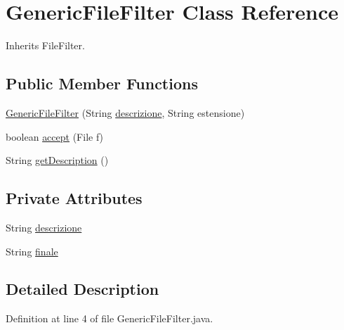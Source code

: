 \hypertarget{class_generic_file_filter}{\section{Generic\-File\-Filter Class Reference}
\label{class_generic_file_filter}
}


Inherits File\-Filter.

\subsection*{Public Member Functions}
\begin{DoxyCompactItemize}
\item 
\hyperlink{class_generic_file_filter_a96d78c6c212bfbf0be95a4d10937a89d}{Generic\-File\-Filter} (String \hyperlink{class_generic_file_filter_a9953e3b3aa3dee91452cb9c2ad80822b}{descrizione}, String estensione)
\item 
boolean \hyperlink{class_generic_file_filter_a03eee4e0d87525559746265dc63c9319}{accept} (File f)
\item 
String \hyperlink{class_generic_file_filter_a6918acbc60f5dcff51cb92a9487e2493}{get\-Description} ()
\end{DoxyCompactItemize}
\subsection*{Private Attributes}
\begin{DoxyCompactItemize}
\item 
String \hyperlink{class_generic_file_filter_a9953e3b3aa3dee91452cb9c2ad80822b}{descrizione}
\item 
String \hyperlink{class_generic_file_filter_a9468f04e6ea80d41e6bc69b59769b751}{finale}
\end{DoxyCompactItemize}


\subsection{Detailed Description}


Definition at line 4 of file Generic\-File\-Filter.\-java.



